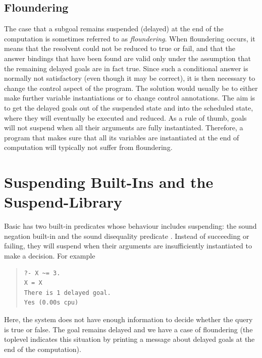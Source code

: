 \subsection{Floundering}
The case that a subgoal remains suspended (delayed) at the end of the computation
 is sometimes referred to as {\it floundering}.
When floundering occurs, it means that the resolvent could not be reduced
to true or fail, and that the answer bindings that have been found
are valid only under the assumption that the remaining delayed goals
are in fact true. Since such a conditional answer is normally not
satisfactory (even though it may be correct), it is then necessary to change
the control aspect of the program.  The solution would usually be to either
make further variable instantiations or to change control annotations.
The aim is to get the delayed goals out of the suspended state and
into the scheduled state, where they will eventually be executed and reduced.
As a rule of thumb, goals will not suspend when all their arguments are
fully instantiated. Therefore, a program that makes sure that all its
variables are instantiated at the end of computation will typically not
suffer from floundering.


\section{Suspending Built-Ins and the Suspend-Library}

Basic {\eclipse} has two built-in predicates whose behaviour includes
suspending: the sound negation built-in
 and the sound disequality
predicate .
Instead of succeeding or failing, they will suspend when their arguments
are insufficiently instantiated to make a decision. For example
\begin{quote}\begin{verbatim}
?- X ~= 3.
X = X
There is 1 delayed goal.
Yes (0.00s cpu)
\end{verbatim}\end{quote}
Here, the system does not have enough information to decide whether the
query is true or false. The goal remains delayed and we have a case of
floundering
(the {\eclipse} toplevel indicates this situation by printing a message
about delayed goals at the end of the computation).

